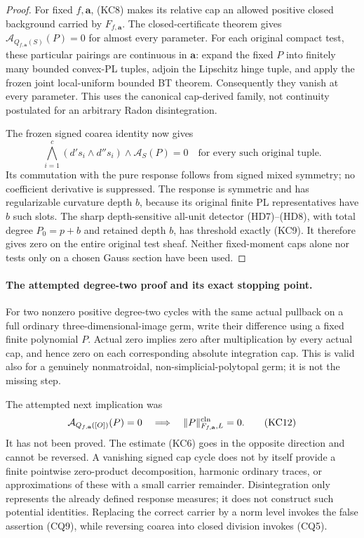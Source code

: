 \begin{proof}
For fixed \(f,\mathbf a\), (KC8) makes its relative cap an allowed
positive closed background carried by \(F_{f,\mathbf a}\).
The closed-certificate theorem gives
\(\mathcal A_{Q_{f,\mathbf a}(S)}(P)=0\) for almost every parameter.
For each original compact test, these particular pairings are
continuous in \(\mathbf a\): expand the fixed \(P\) into finitely
many bounded convex-PL tuples, adjoin the Lipschitz hinge tuple,
and apply the frozen joint local-uniform bounded BT theorem.
Consequently they vanish at every parameter. This uses the
canonical cap-derived family, not continuity postulated for an
arbitrary Radon disintegration.

The frozen signed coarea identity now gives
\[
       \bigwedge_{i=1}^c(d's_i\wedge d''s_i)
                         \wedge\mathcal A_S(P)=0
                         \quad\text{for every such original tuple}.
 \tag{KC11}
\]
Its commutation with the pure response follows from signed mixed
symmetry; no coefficient derivative is suppressed. The response
is symmetric and has regularizable curvature depth \(b\), because
its original finite PL representatives have \(b\) such slots.
The sharp depth-sensitive all-unit detector (HD7)--(HD8), with
total degree \(P_0=p+b\) and retained depth \(b\), has threshold
exactly (KC9). It therefore gives zero on the entire original
test sheaf. Neither fixed-moment caps alone nor tests only on a
chosen Gauss section have been used.
\end{proof}

\paragraph{The attempted degree-two proof and its exact stopping point.}
For two nonzero positive degree-two cycles with the same actual
pullback on a full ordinary three-dimensional-image germ, write
their difference using a fixed finite polynomial \(P\).
Actual zero implies zero after multiplication by every actual cap,
and hence zero on each corresponding absolute integration cap.
This is valid also for a genuinely nonmatroidal,
non-simplicial-polytopal germ; it is not the missing step.

The attempted next implication was
\[
 \mathcal A_{Q_{f,\mathbf a}([O])}(P)=0
       \quad\Longrightarrow\quad
                       \|P\|^{\rm cln}_{F_{f,\mathbf a},L}=0.
 \tag{KC12}
\]
It has not been proved. The estimate (KC6) goes in the opposite
direction and cannot be reversed. A vanishing signed cap cycle
does not by itself provide a finite pointwise zero-product
decomposition, harmonic ordinary traces, or approximations of
these with a small carrier remainder. Disintegration only
represents the already defined response measures; it does not
construct such potential identities. Replacing the correct
carrier by a norm level invokes the false assertion (CQ9),
while reversing coarea into closed division invokes (CQ5).

